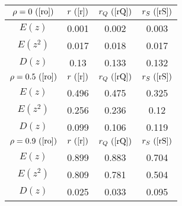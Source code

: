 \begin{tabular}{|c|c|c|c|}
\hline
$\rho = 0~(\ref{ro})$ & $r ~(\ref{r})$ & $r_Q ~(\ref{rQ})$ & $r_S ~(\ref{rS})$\\
\hline
$E(z)$ & 0.001 & 0.002 & 0.003\\
\hline
$E(z^2)$ & 0.017 & 0.018 & 0.017\\
\hline
$D(z)$ & 0.13 & 0.133 & 0.132\\
\hline
$\rho = 0.5~(\ref{ro})$ & $r ~(\ref{r})$ & $r_Q ~(\ref{rQ})$ & $r_S ~(\ref{rS})$\\
\hline
$E(z)$ & 0.496 & 0.475 & 0.325\\
\hline
$E(z^2)$ & 0.256 & 0.236 & 0.12\\
\hline
$D(z)$ & 0.099 & 0.106 & 0.119\\
\hline
$\rho = 0.9~(\ref{ro})$ & $r ~(\ref{r})$ & $r_Q ~(\ref{rQ})$ & $r_S ~(\ref{rS})$\\
\hline
$E(z)$ & 0.899 & 0.883 & 0.704\\
\hline
$E(z^2)$ & 0.809 & 0.781 & 0.504\\
\hline
$D(z)$ & 0.025 & 0.033 & 0.095\\
\hline
\end{tabular}